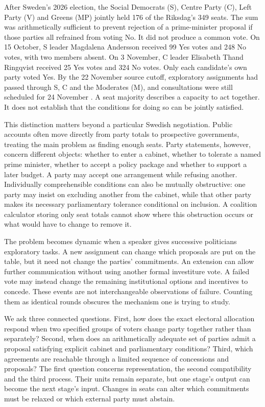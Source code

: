 \documentclass[11pt,a4paper]{article}
\begin{document}
After Sweden's 2026 election, the Social Democrats (S), Centre Party (C), Left Party (V) and Greens (MP) jointly held 176 of the Riksdag's 349 seats. The sum was arithmetically sufficient to prevent rejection of a prime-minister proposal if those parties all refrained from voting No. It did not produce a common vote. On 15 October, S leader Magdalena Andersson received 99 Yes votes and 248 No votes, with two members absent. On 3 November, C leader Elisabeth Thand Ringqvist received 25 Yes votes and 324 No votes. Only each candidate's own party voted Yes. By the 22 November source cutoff, exploratory assignments had passed through S, C and the Moderates (M), and consultations were still scheduled for 24 November \citep{riksdagAndersson,riksdagRingqvist,riksdag24nov}. A seat majority describes a capacity to act together. It does not establish that the conditions for doing so can be jointly satisfied.

This distinction matters beyond a particular Swedish negotiation. Public accounts often move directly from party totals to prospective governments, treating the main problem as finding enough seats. Party statements, however, concern different objects: whether to enter a cabinet, whether to tolerate a named prime minister, whether to accept a policy package and whether to support a later budget. A party may accept one arrangement while refusing another. Individually comprehensible conditions can also be mutually obstructive: one party may insist on excluding another from the cabinet, while that other party makes its necessary parliamentary tolerance conditional on inclusion. A coalition calculator storing only seat totals cannot show where this obstruction occurs or what would have to change to remove it.

The problem becomes dynamic when a speaker gives successive politicians exploratory tasks. A new assignment can change which proposals are put on the table, but it need not change the parties' commitments. An extension can allow further communication without using another formal investiture vote. A failed vote may instead change the remaining institutional options and incentives to concede. These events are not interchangeable observations of failure. Counting them as identical rounds obscures the mechanism one is trying to study.

We ask three connected questions. First, how does the exact electoral allocation respond when two specified groups of voters change party together rather than separately? Second, when does an arithmetically adequate set of parties admit a proposal satisfying explicit cabinet and parliamentary conditions? Third, which agreements are reachable through a limited sequence of concessions and proposals? The first question concerns representation, the second compatibility and the third process. Their units remain separate, but one stage's output can become the next stage's input. Changes in seats can alter which commitments must be relaxed or which external party must abstain.
\end{document}
